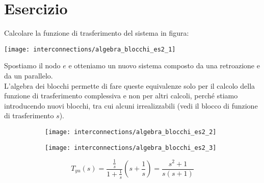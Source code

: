 \documentclass[../main.tex]{subfiles}
\begin{document}
	\section{Esercizio}
	Calcolare la funzione di trasferimento del sistema in figura:
	\begin{center}
		\texttt{[image: interconnections/algebra\_blocchi\_es2\_1]}
	\end{center}
	Spostiamo il nodo $ e $ e otteniamo un nuovo sistema composto da una retroazione e da un parallelo.\\
	L'algebra dei blocchi permette di fare queste equivalenze solo per il calcolo della funzione di trasferimento complessiva e non per altri calcoli, perch\'e stiamo introducendo nuovi blocchi, tra cui alcuni irrealizzabili (vedi il blocco di funzione di trasferimento $ s $).
	\begin{figure}[H]
		\centering
		\begin{subfigure}{0.5\textwidth}
			\texttt{[image: interconnections/algebra\_blocchi\_es2\_2]}
		\end{subfigure}%
		\begin{subfigure}{0.5\textwidth}
			\texttt{[image: interconnections/algebra\_blocchi\_es2\_3]}
		\end{subfigure}%
	\end{figure}
	\[ T_{yu}(s) = \frac{\frac{1}{s}}{1+\frac{1}{s}} \left( s+\frac{1}{s} \right) = \frac{s^2+1}{s(s+1)} \]
\end{document}
